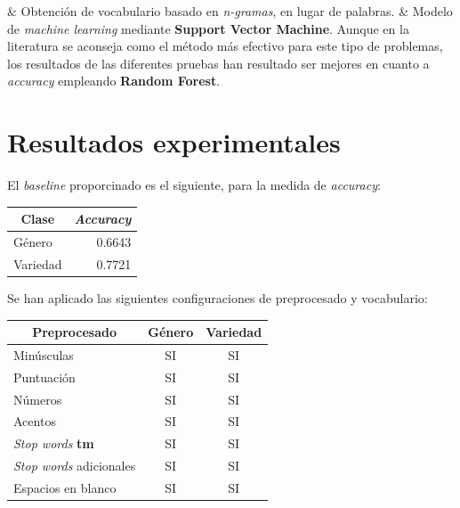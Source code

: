 \documentclass[11pt,a4paper]{article}
\begin{document}
\begin{easylist}
& Obtenci\'on de vocabulario basado en \textit{n-gramas}, en lugar de palabras.
& Modelo de \textit{machine learning} mediante \textbf{Support Vector Machine}. Aunque en la literatura se aconseja como el m\'etodo m\'as efectivo para este tipo de problemas, los resultados de las diferentes pruebas han resultado ser mejores en cuanto a \textit{accuracy} empleando \textbf{Random Forest}.
\end{easylist}

\section{Resultados experimentales}

El \textit{baseline} proporcinado es el siguiente, para la medida de \textit{accuracy}:

\begin{center}
\begin{tabular}{|l|l|}
\hline
\multicolumn{1}{|c|}{\textbf{Clase}} & \multicolumn{1}{|c|}{\textbf{\textit{Accuracy}}} \\
\hline \hline
G\'enero & \multicolumn{1}{|r|}{0.6643} \\ \hline
Variedad & \multicolumn{1}{|r|}{0.7721} \\ \hline
\end{tabular}
\end{center}

Se han aplicado las siguientes configuraciones de preprocesado y vocabulario:

\begin{center}
\begin{tabular}{|l|l|l|}
\hline
\multicolumn{1}{|c|}{\textbf{Preprocesado}} & \multicolumn{1}{|c|}{\textbf{G\'enero}} & \multicolumn{1}{|c|}{\textbf{Variedad}} \\
\hline \hline
Min\'usculas & \multicolumn{1}{|c|}{SI} & \multicolumn{1}{|c|}{SI} \\ \hline
Puntuaci\'on & \multicolumn{1}{|c|}{SI} & \multicolumn{1}{|c|}{SI} \\ \hline
N\'umeros & \multicolumn{1}{|c|}{SI} & \multicolumn{1}{|c|}{SI} \\ \hline
Acentos & \multicolumn{1}{|c|}{SI} & \multicolumn{1}{|c|}{SI} \\ \hline
\textit{Stop words} \textbf{tm} & \multicolumn{1}{|c|}{SI} & \multicolumn{1}{|c|}{SI} \\ \hline
\textit{Stop words} adicionales & \multicolumn{1}{|c|}{SI} & \multicolumn{1}{|c|}{SI} \\ \hline
Espacios en blanco & \multicolumn{1}{|c|}{SI} & \multicolumn{1}{|c|}{SI} \\ \hline
\end{tabular}
\end{center}
\end{document}

